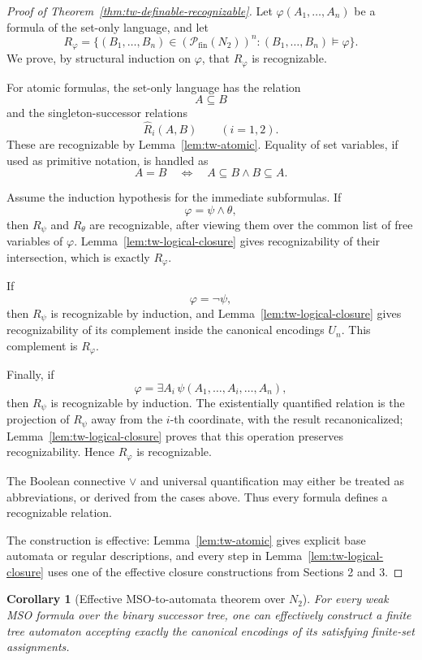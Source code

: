 \documentclass[11pt]{article}
\newtheorem{corollary}[theorem]{Corollary}
\theoremstyle{definition}
\newcommand{\powfin}{\mathcal P_{\mathrm{fin}}}
\begin{document}
\begin{proof}[Proof of Theorem~\ref{thm:tw-definable-recognizable}]
Let \(\varphi(A_1,\ldots,A_n)\) be a formula of the set-only language, and let
\[
  R_\varphi
  =
  \{(B_1,\ldots,B_n)\in(\powfin(N_2))^n:
      (B_1,\ldots,B_n)\models\varphi\}.
\]
We prove, by structural induction on \(\varphi\), that \(R_\varphi\) is
recognizable.

For atomic formulas, the set-only language has the relation
\[
  A\subseteq B
\]
and the singleton-successor relations
\[
  \widehat R_i(A,B) \qquad (i=1,2).
\]
These are recognizable by Lemma~\ref{lem:tw-atomic}.  Equality of set variables,
if used as primitive notation, is handled as
\[
  A=B \quad\Longleftrightarrow\quad A\subseteq B\wedge B\subseteq A.
\]

Assume the induction hypothesis for the immediate subformulas.  If
\[
  \varphi=\psi\wedge\theta,
\]
then \(R_\psi\) and \(R_\theta\) are recognizable, after viewing them over the
common list of free variables of \(\varphi\).  Lemma~\ref{lem:tw-logical-closure}
gives recognizability of their intersection, which is exactly \(R_\varphi\).

If
\[
  \varphi=\neg\psi,
\]
then \(R_\psi\) is recognizable by induction, and
Lemma~\ref{lem:tw-logical-closure} gives recognizability of its complement
inside the canonical encodings \(U_n\).  This complement is \(R_\varphi\).

Finally, if
\[
  \varphi=\exists A_i\,\psi(A_1,\ldots,A_i,\ldots,A_n),
\]
then \(R_\psi\) is recognizable by induction.  The existentially quantified
relation is the projection of \(R_\psi\) away from the \(i\)-th coordinate, with
the result recanonicalized; Lemma~\ref{lem:tw-logical-closure} proves that this
operation preserves recognizability.  Hence \(R_\varphi\) is recognizable.

The Boolean connective \(\vee\) and universal quantification may either be
treated as abbreviations, or derived from the cases above.  Thus every formula
defines a recognizable relation.

The construction is effective: Lemma~\ref{lem:tw-atomic} gives explicit base
automata or regular descriptions, and every step in
Lemma~\ref{lem:tw-logical-closure} uses one of the effective closure
constructions from Sections 2 and 3.
\end{proof}

\begin{corollary}[Effective MSO-to-automata theorem over \(N_2\)]
For every weak MSO formula over the binary successor tree, one can effectively
construct a finite tree automaton accepting exactly the canonical encodings of
its satisfying finite-set assignments.
\end{corollary}
\end{document}
